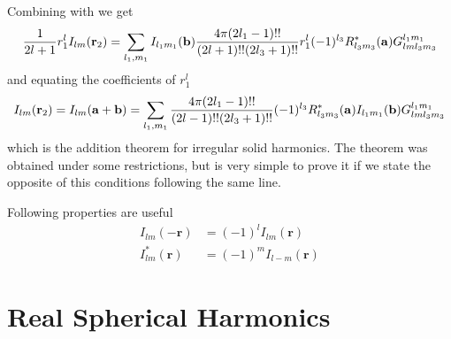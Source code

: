 \par{Combining  with  we get}
\begin{equation}
\frac{1}{2l+1}r_1^lI_{lm}({\bf r}_2)=\sum_{l_1,m_1}I_{l_1m_1}({{\bf b}})\frac{4\pi(2l_1-1)!!}{(2l+1)!!(2l_3+1)!!}r_1^{l}(-1)^{l_3}R_{l_3m_3}^{*}({\bf a})G_{lml_3m_3}^{l_1m_1}
\end{equation}
and equating the coefficients of ${r}_1^{l}$
\begin{equation*}
I_{lm}({\bf r}_2)=I_{lm}({\bf a}+{\bf b})=\sum_{l_1,m_1}\frac{4\pi(2l_1-1)!!}{(2l-1)!!(2l_3+1)!!}(-1)^{l_3}R_{l_3m_3}^{*}({\bf a})I_{l_1m_1}({{\bf b}})G_{lml_3m_3}^{l_1m_1}
\end{equation*}
which is the addition theorem for irregular solid harmonics. The theorem was
obtained under some restrictions, but is very simple to prove it if we state the
opposite of this conditions following the same line.
\par{Following properties are useful}
\begin{equation}
\begin{split}
I_{lm}(-\bm{r})&=(-1)^lI_{lm}(\bm{r})\\
I_{lm}^{*}(\bm{r})&=(-1)^mI_{l-m}(\bm{r})
\end{split}
\end{equation} 
\section[Real Spherical ...]{Real Spherical Harmonics}
